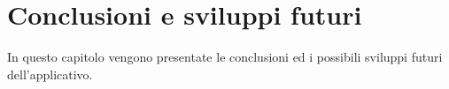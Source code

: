 \chapter{Conclusioni e sviluppi futuri}
\label{cha:conclusioni}
In questo capitolo vengono presentate le conclusioni ed i possibili sviluppi futuri dell'applicativo.
